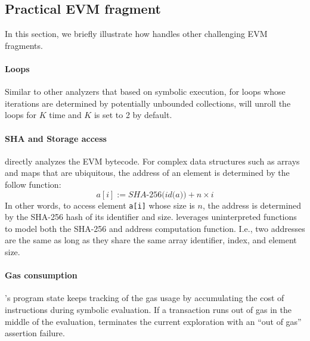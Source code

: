 \subsection{Practical EVM fragment}\label{sec:fragment}
In this section, we briefly illustrate how \toolname handles other challenging EVM fragments.

\paragraph{Loops} Similar to other analyzers that based on symbolic execution, for loops whose iterations are determined by potentially unbounded collections, \toolname will unroll the loops for $K$ time and $K$ is set to 2 by default.

\paragraph{SHA and Storage access}
\toolname directly analyzes the EVM bytecode. For complex data structures such as arrays and maps that are ubiquitous, the address of an element is determined by the follow function:
\[
a[i] := \textit{SHA-256(id(a))} + n \times i
\]
In other words, to access element \texttt{a[i]} whose size is $n$, the address is determined by the
SHA-256 hash of its identifier and size. \toolname leverages uninterpreted functions to model both the SHA-256 and address computation function. I.e., two addresses are the same as long as they share the same array identifier, index, and element size.

\paragraph{Gas consumption} \toolname's program state keeps tracking of the gas usage by accumulating the cost of instructions during symbolic evaluation. If a transaction runs out of gas in the middle of the evaluation,  \toolname terminates the current exploration with an “out of gas” assertion failure.
